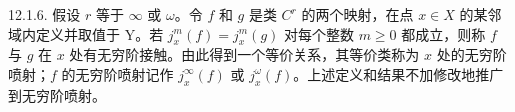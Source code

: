 12.1.6. 假设 \(r\) 等于 \(\infty\) 或 \(\omega\)。令 \(f\) 和 \(g\) 是类 \(C^{r}\) 的两个映射，在点 \(x \in X\) 的某邻域内定义并取值于 Y。若 \(j_x^m(f) = j_x^m(g)\) 对每个整数 \(m \geqslant 0\) 都成立，则称 \(f\) 与 \(g\) 在 \(x\) 处有无穷阶接触。由此得到一个等价关系，其等价类称为 \(x\) 处的无穷阶喷射；\(f\) 的无穷阶喷射记作 \(j_x^\infty(f)\) 或 \(j_x^\omega(f)\)。上述定义和结果不加修改地推广到无穷阶喷射。

